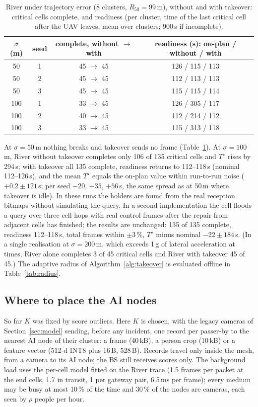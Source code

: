 \begin{table}[t]\centering
\caption{River under trajectory error (8 clusters, $R_{50}=99$\,m), without and with takeover: critical cells complete,
and readiness (per cluster, time of the last critical cell after the UAV leaves, mean over clusters; 900\,s if
incomplete).}\label{tab:wind}
\setlength{\tabcolsep}{2.5pt}\scriptsize
\begin{tabular}{cccc}\toprule
$\sigma$ (m) & seed & complete, without $\to$ with & readiness (s): on-plan / without / with\\\midrule
50 & 1 & 45 $\to$ 45 & 126 / 115 / 113\\
50 & 2 & 45 $\to$ 45 & 112 / 113 / 113\\
50 & 3 & 45 $\to$ 45 & 115 / 115 / 114\\
100 & 1 & 33 $\to$ 45 & 126 / 305 / 117\\
100 & 2 & 40 $\to$ 45 & 112 / 214 / 112\\
100 & 3 & 33 $\to$ 45 & 115 / 313 / 118\\\bottomrule
\end{tabular}
\end{table}

At $\sigma=50$\,m nothing breaks and takeover sends no frame (Table~\ref{tab:wind}). At $\sigma=100$\,m, River without
takeover completes only 106 of 135 critical cells and $T^\star$ rises by 294\,s; with takeover all 135 complete, readiness
returns to 112--118\,s (nominal 112--126\,s), and the mean $T^\star$ equals the on-plan value within run-to-run noise
($+0.2\pm121$\,s; per seed $-20$, $-35$, $+56$\,s, the same spread as at 50\,m where takeover is idle). In these runs the
holders are found from the real reception bitmaps without simulating the query. In a second implementation the \spine{}
cell floods a query over three cell hops with real control frames after the repair from adjacent cells has finished;
the results are unchanged: 135 of 135 complete, readiness 112--118\,s, total frames within $\pm3$\,\%, $T^\star$ minus
nominal $-22\pm184$\,s. (In a single realisation at $\sigma=200$\,m, which exceeds 1\,g of lateral acceleration at
times, River alone completes 3 of 45 critical cells and River with takeover 45 of 45.) The adaptive radius of
Algorithm~\ref{alg:takeover} is evaluated offline in Table~\ref{tab:radius}.

\subsection{Where to place the AI nodes}\label{sec:aicells}
So far $K$ was fixed by score outliers. Here $K$ is chosen, with the legacy cameras of Section~\ref{sec:model} sending,
before any incident, one record per passer-by to the nearest AI node of their cluster: a frame (40\,kB), a person crop
(10\,kB) or a feature vector (512-d INT8 plus 16\,B, 528\,B). Records travel only inside the mesh, from a camera to its
AI node; the BS still receives scores only. The background load uses the per-cell model fitted on the River trace (1.5 frames per
packet at the end cells, 1.7 in transit, 1 per gateway pair, 6.5\,ms per frame); every medium may be busy at most 10\,\% of
the time and 30\,\% of the nodes are cameras, each seen by $\rho$ people per hour.

